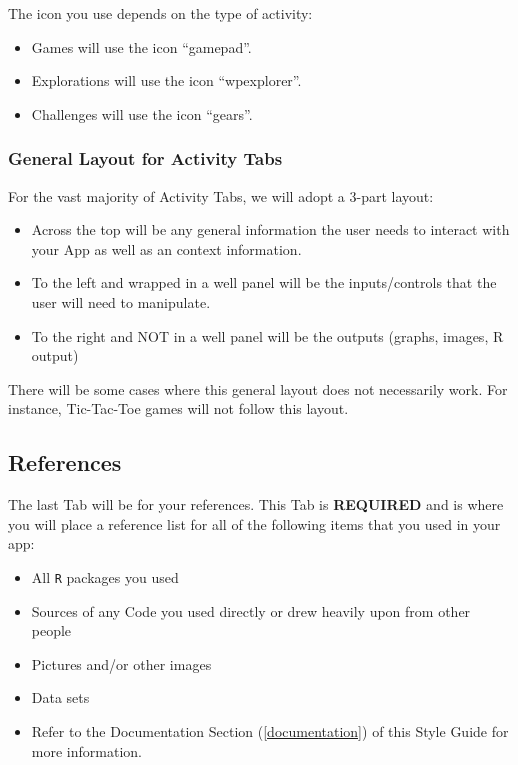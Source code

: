 \documentclass[
]{book}
\providecommand{\tightlist}{%
  \setlength{\itemsep}{0pt}\setlength{\parskip}{0pt}}
\begin{document}
The icon you use depends on the type of activity:

\begin{itemize}
\tightlist
\item
  Games will use the icon ``gamepad''.
\item
  Explorations will use the icon ``wpexplorer''.
\item
  Challenges will use the icon ``gears''.
\end{itemize}

\hypertarget{general-layout-for-activity-tabs}{%
\subsubsection{General Layout for Activity Tabs}\label{general-layout-for-activity-tabs}}

For the vast majority of Activity Tabs, we will adopt a 3-part layout:

\begin{itemize}
\tightlist
\item
  Across the top will be any general information the user needs to interact with your App as well as an context information.
\item
  To the left and wrapped in a well panel will be the inputs/controls that the user will need to manipulate.
\item
  To the right and NOT in a well panel will be the outputs (graphs, images, R output)
\end{itemize}

There will be some cases where this general layout does not necessarily work. For instance, Tic-Tac-Toe games will not follow this layout.

\hypertarget{references}{%
\subsection{References}\label{references}}

The last Tab will be for your references. This Tab is \textbf{REQUIRED} and is where you will place a reference list for all of the following items that you used in your app:

\begin{itemize}
\tightlist
\item
  All \texttt{R} packages you used
\item
  Sources of any Code you used directly or drew heavily upon from other people
\item
  Pictures and/or other images
\item
  Data sets
\item
  Refer to the Documentation Section (\ref{documentation}) of this Style Guide for more information.
\end{itemize}
\end{document}
